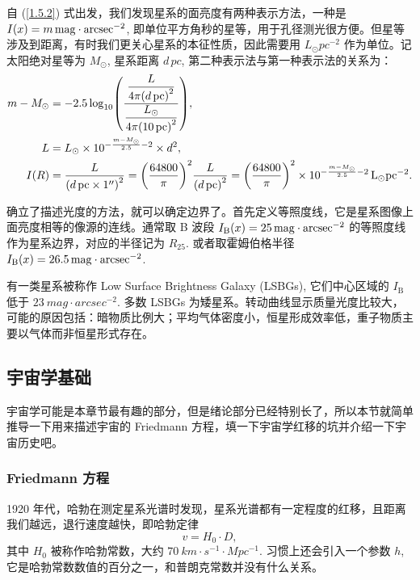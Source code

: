 \documentclass[../天体物理基础.tex]{subfiles}
\begin{document}
自 (\ref{1.5.2}) 式出发，我们发现星系的面亮度有两种表示方法，一种是 $I\mleft(x\mright)=m\,\unit{mag\cdot arcsec^{-2}}$, 即单位平方角秒的星等，用于孔径测光很方便。但星等涉及到距离，有时我们更关心星系的本征性质，因此需要用 $\unit{L_{\odot}pc^{-2}}$ 作为单位。记太阳绝对星等为 $M_{\odot}$, 星系距离 $d\,\unit{pc}$, 第二种表示法与第一种表示法的关系为：
\begin{align}
m-M_{\odot}&=-2.5\log_{10}\mleft(\frac{\dfrac{L}{4\pi\mleft(d\,\unit{pc}\mright)^{2}}}{\dfrac{L_{\odot}}{4\pi\mleft(\qty{10}{pc}\mright)^{2}}}\mright),\notag\\
L&=L_{\odot}\times10^{-\frac{m-M_{\odot}}{2.5}-2}\times d^{2},\notag\\
I\mleft(R\mright)&=\frac{L}{\mleft(d\,\unit{pc}\times\ang{;; 1}\mright)^{2}}=\mleft(\frac{64800}{\pi}\mright)^{2}\frac{L}{\mleft(d\,\unit{pc}\mright)^{2}}=\mleft(\frac{64800}{\pi}\mright)^{2}\times10^{-\frac{m-M_{\odot}}{2.5}-2}\,\unit{L_{\odot}pc^{-2}}.
\end{align}

确立了描述光度的方法，就可以确定边界了。首先定义等照度线，它是星系图像上面亮度相等的像源的连线。通常取 B 波段 $I_{\mathrm{B}}\mleft(x\mright)=\qty{25}{mag\cdot{}arcsec^{-2}}$ 的等照度线作为星系边界，对应的半径记为 $R_{25}$. 或者取霍姆伯格半径 $I_{\mathrm{B}}\mleft(x\mright)=\qty{26.5}{mag\cdot{}arcsec^{-2}}$.

有一类星系被称作 Low Surface Brightness Galaxy (LSBGs), 它们中心区域的 $I_{\mathrm{B}}$ 低于 $\qty{23}{mag\cdot{}arcsec^{-2}}$. 多数 LSBGs 为矮星系。转动曲线显示质量光度比较大，可能的原因包括：暗物质比例大；平均气体密度小，恒星形成效率低，重子物质主要以气体而非恒星形式存在。

\subsection{宇宙学基础}
宇宙学可能是本章节最有趣的部分，但是绪论部分已经特别长了，所以本节就简单推导一下用来描述宇宙的 Friedmann 方程，填一下宇宙学红移的坑并介绍一下宇宙历史吧。

\subsubsection{Friedmann 方程}
1920 年代，哈勃在测定星系光谱时发现，星系光谱都有一定程度的红移，且距离我们越远，退行速度越快，即哈勃定律
\begin{equation}
v=H_{0}\cdot D,
\end{equation}
其中 $H_{0}$ 被称作哈勃常数，大约 $\qty{70}{km\cdot{}s^{-1}\cdot{}Mpc^{-1}}$. 习惯上还会引入一个参数 $h$, 它是哈勃常数数值的百分之一，和普朗克常数并没有什么关系。
\end{document}
